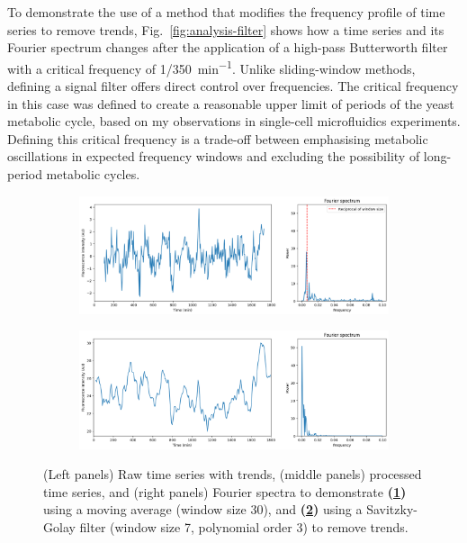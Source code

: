 To demonstrate the use of a method that modifies the frequency profile of time series to remove trends, Fig.\ \ref{fig:analysis-filter} shows how a time series and its Fourier spectrum changes after the application of a high-pass Butterworth filter with a critical frequency of \SI[parse-numbers=false]{1/350}{\minute^{-1}}.
Unlike sliding-window methods, defining a signal filter offers direct control over frequencies.
The critical frequency in this case was defined to create a reasonable upper limit of periods of the yeast metabolic cycle, based on my observations in single-cell microfluidics experiments.
Defining this critical frequency is a trade-off between emphasising metabolic oscillations in expected frequency windows and excluding the possibility of long-period metabolic cycles.


\begin{figure}
  \centering
  \begin{subfigure}[htpb]{0.8\textwidth}
   \centering
   \includegraphics[width=\textwidth]{fft_slidingwindow}
   \caption{
   }
   \label{fig:analysis-slidingwindow-movavg}
  \end{subfigure}

  \begin{subfigure}[htpb]{0.8\textwidth}
   \centering
   \includegraphics[width=\textwidth]{fft_savgol}
   \caption{
   }
   \label{fig:analysis-slidingwindow-savgol}
  \end{subfigure}

  \caption{
    (Left panels) Raw time series with trends, (middle panels) processed time series, and (right panels) Fourier spectra to demonstrate
    \textbf{(\ref{fig:analysis-slidingwindow-movavg})}
    using a moving average (window size 30), and
    \textbf{(\ref{fig:analysis-slidingwindow-savgol})}
    using a Savitzky-Golay filter (window size 7, polynomial order 3)
    to remove trends.
  }
  \label{fig:analysis-slidingwindow}
\end{figure}

